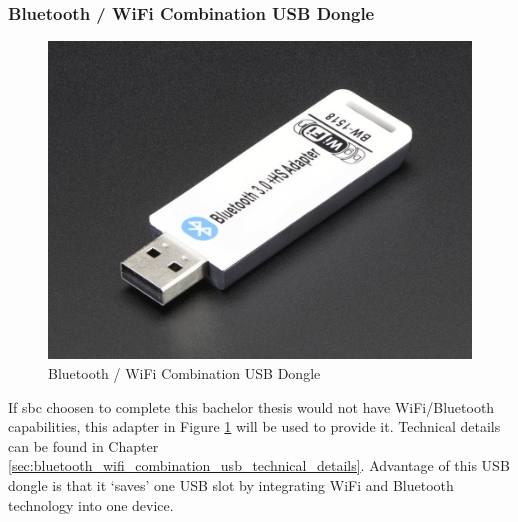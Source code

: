 \subsubsection{Bluetooth / WiFi Combination USB Dongle} %
\label{ssub:bluetooth_wifi_combination_usb_dongle}
\begin{figure}[H]
\begin{center}
\captionsetup{font=small}
\includegraphics[scale=0.2]{pics/dongle.jpg}
\caption{Bluetooth / WiFi Combination USB Dongle}
\label{fig:wifi}
\end{center}
\end{figure}
If \gls{sbc} choosen to complete this bachelor thesis would not have WiFi/Bluetooth capabilities, this adapter in Figure \ref{fig:wifi} will be used to provide it. Technical details can be found in Chapter \ref{sec:bluetooth_wifi_combination_usb_technical_details}. Advantage of this USB dongle is that it `saves' one USB slot by integrating WiFi and Bluetooth technology into one device.
